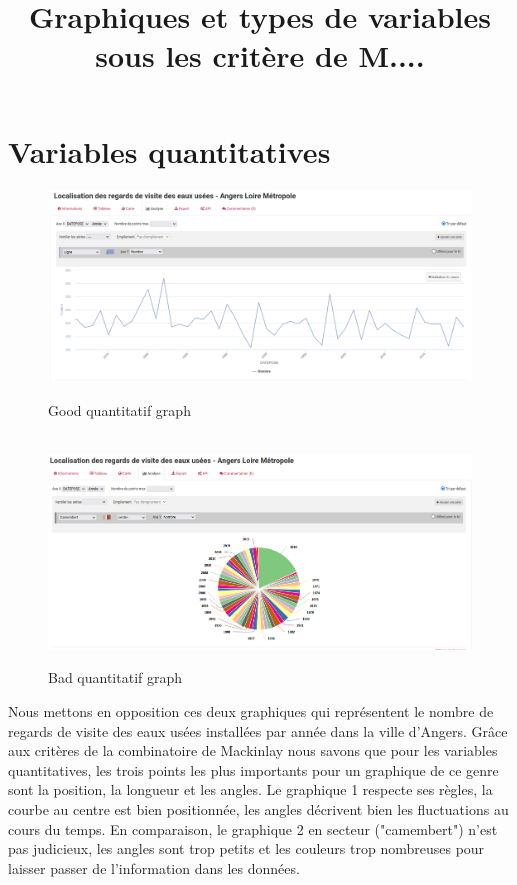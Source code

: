 \documentclass[a4paper,11pt]{article}
\begin{document}
	
\lhead{}\chead{}\rhead{}\renewcommand{\headrulewidth}{0pt}\renewcommand{\footrulewidth}{0.4pt}

\title{Graphiques et types de variables sous les critère de M....}
\maketitle
\section{Variables quantitatives}

\begin{figure}[h] %
	\centering
	\includegraphics[width=0.7\linewidth]{quantitatif_ok.png} %
	\caption{Good quantitatif graph } %
	\label{fig1}\hfil\\ %
	
	
	\includegraphics[width=0.8\linewidth]{quantitatif_no.png} %
	\caption{Bad quantitatif graph } %
	\label{fig2} %
\end{figure}
Nous mettons en opposition ces deux graphiques qui représentent le nombre de regards de visite des eaux usées installées par année dans la ville d'Angers. Grâce aux critères de la combinatoire de Mackinlay nous savons que pour les variables quantitatives, les trois points les plus importants pour un graphique de ce genre sont la position, la longueur et les angles. Le graphique 1 respecte ses règles, la courbe au centre est bien positionnée, les angles décrivent bien les fluctuations au cours du temps. En comparaison, le graphique 2 en secteur ("camembert") n'est pas judicieux, les angles sont trop petits et les couleurs trop nombreuses pour laisser passer de l'information dans les données. 
\newpage
\end{document}

